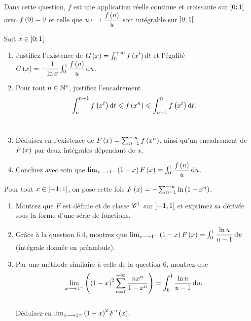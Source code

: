 \begin{q}
Dans cette question, \(f\) est une application réelle continue et croissante sur \(\left[0;1\right[\) avec \(f\left(0\right)=0\) et telle que \(u\longmapsto\dfrac{f\left(u\right)}{u}\) soit intégrable sur \(\left]0;1\right[\).

Soit \(x\in\left]0;1\right[\).

\begin{enumerate}
    \item Justifiez l'existence de \(G\paren{x}=\int_0^{\pinf}f\paren{x^t}\odif{t}\) et l'égalité \(G\paren{x}=-\dfrac{1}{\ln x}\int_0^1\dfrac{f\paren{u}}{u}\odif{u}\). \\
    \item Pour tout \(n\in\mathbb{N}^*\), justifiez l'encadrement \[\int_n^{n+1}f\paren{x^t}\odif{t}\leq f\paren{x^n}\leq\int_{n-1}^nf\paren{x^t}\odif{t}.\] \\
    \item Déduisez-en l'existence de \(F\left(x\right)=\sum_{n=1}^{+\infty}f\left(x^n\right)\), ainsi qu'un encadrement de \(F\left(x\right)\) par deux intégrales dépendant de \(x\). \\
    \item Concluez avec soin que \(\lim_{x\to1^-}\paren{1-x}F\paren{x}=\int_0^1\dfrac{f\paren{u}}{u}\odif{u}\).
\end{enumerate}
\end{q}

\begin{q}

Pour tout \(x\in\left]-1;1\right[\), on pose cette fois \(F\left(x\right)=-\sum_{n=1}^{+\infty}\ln\left(1-x^n\right)\).

\begin{enumerate}
    \item Montrez que \(F\) est définie et de classe \(\mathscr{C}^{1}\) sur \(\left]-1;1\right[\) et exprimez sa dérivée sous la forme d'une série de fonctions. \\
    \item Grâce à la question 6.4, montrez que \(\lim_{x\to1^-}\paren{1-x}F\paren{x}=\int_0^1\dfrac{\ln u}{u-1}\odif{u}\) (intégrale donnée en préambule). \\
    \item Par une méthode similaire à celle de la question 6, montrez que \[\lim_{x\to1^-}\paren{\paren{1-x}^2\sum_{n=1}^{\pinf}\dfrac{nx^n}{1-x^n}}=\int_0^1\dfrac{\ln u}{u-1}\odif{u}.\] \\ Déduisez-en \(\lim_{x\longrightarrow1^-}\left(1-x\right)^2F^{\,\prime}\left(x\right)\).
\end{enumerate}
\end{q}

